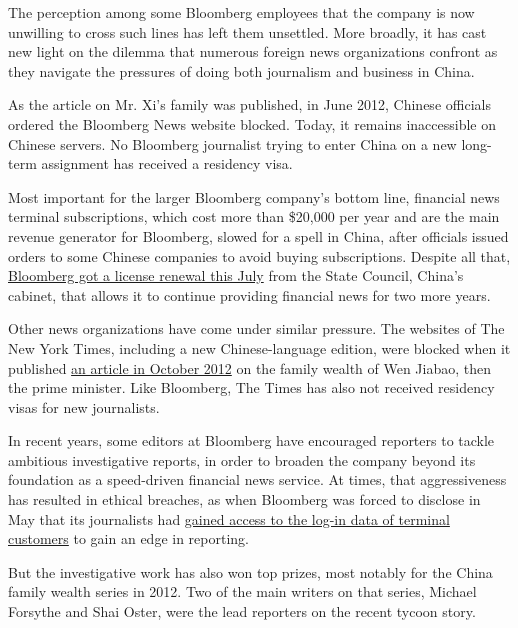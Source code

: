 The perception among some Bloomberg employees that the company is now
unwilling to cross such lines has left them unsettled. More broadly, it
has cast new light on the dilemma that numerous foreign news
organizations confront as they navigate the pressures of doing both
journalism and business in China.

As the article on Mr. Xi's family was published, in June 2012, Chinese
officials ordered the Bloomberg News website blocked. Today, it remains
inaccessible on Chinese servers. No Bloomberg journalist trying to enter
China on a new long-term assignment has received a residency visa.

Most important for the larger Bloomberg company's bottom line, financial
news terminal subscriptions, which cost more than \$20,000 per year and
are the main revenue generator for Bloomberg, slowed for a spell in
China, after officials issued orders to some Chinese companies to avoid
buying subscriptions. Despite all that,
\href{http://www.scio.gov.cn/jrxx/xkmd/1/Document/1063839/1063839.htm}{Bloomberg
got a license renewal this July} from the State Council, China's
cabinet, that allows it to continue providing financial news for two
more years.

Other news organizations have come under similar pressure. The websites
of The New York Times, including a new Chinese-language edition, were
blocked when it published
\href{http://www.nytimes3xbfgragh.onion/2012/10/26/business/global/family-of-wen-jiabao-holds-a-hidden-fortune-in-china.html}{an
article in October 2012} on the family wealth of Wen Jiabao, then the
prime minister. Like Bloomberg, The Times has also not received
residency visas for new journalists.

In recent years, some editors at Bloomberg have encouraged reporters to
tackle ambitious investigative reports, in order to broaden the company
beyond its foundation as a speed-driven financial news service. At
times, that aggressiveness has resulted in ethical breaches, as when
Bloomberg was forced to disclose in May that its journalists had
\href{http://www.nytimes3xbfgragh.onion/2013/05/13/business/media/bloomberg-admits-terminal-snooping.html}{gained
access to the log-in data of terminal customers} to gain an edge in
reporting.

But the investigative work has also won top prizes, most notably for the
China family wealth series in 2012. Two of the main writers on that
series, Michael Forsythe and Shai Oster, were the lead reporters on the
recent tycoon story.

